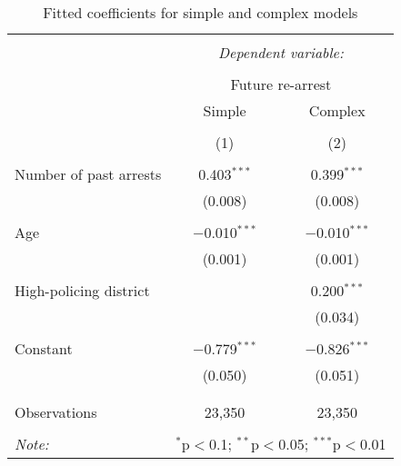 
\begin{table}[!htbp] \centering 
  \caption{Fitted coefficients for simple and complex models} 
  \label{} 
\begin{tabular}{@{\extracolsep{5pt}}lcc} 
\\[-1.8ex]\hline 
\hline \\[-1.8ex] 
 & \multicolumn{2}{c}{\textit{Dependent variable:}} \\ 
\cline{2-3} 
\\[-1.8ex] & \multicolumn{2}{c}{Future re-arrest} \\ 
 & Simple & Complex \\ 
\\[-1.8ex] & (1) & (2)\\ 
\hline \\[-1.8ex] 
 Number of past arrests & 0.403$^{***}$ & 0.399$^{***}$ \\ 
  & (0.008) & (0.008) \\ 
  & & \\ 
 Age & $-$0.010$^{***}$ & $-$0.010$^{***}$ \\ 
  & (0.001) & (0.001) \\ 
  & & \\ 
 High-policing district &  & 0.200$^{***}$ \\ 
  &  & (0.034) \\ 
  & & \\ 
 Constant & $-$0.779$^{***}$ & $-$0.826$^{***}$ \\ 
  & (0.050) & (0.051) \\ 
  & & \\ 
\hline \\[-1.8ex] 
Observations & 23,350 & 23,350 \\ 
\hline 
\hline \\[-1.8ex] 
\textit{Note:}  & \multicolumn{2}{r}{$^{*}$p$<$0.1; $^{**}$p$<$0.05; $^{***}$p$<$0.01} \\ 
\end{tabular} 
\end{table} 
